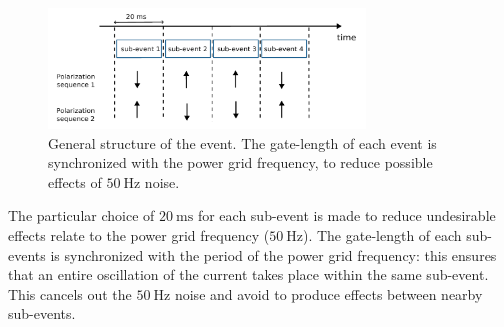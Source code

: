 \begin{figure}[hbtp] 
\centering
\includegraphics[width = 0.75\textwidth]{ExperimentalSetup/EventStructure.pdf}
\caption{General structure of the event. The gate-length of each event is synchronized with the power grid frequency, to reduce possible effects of $\SI{50}{\hertz}$ noise.}
\label{fig:EventStructure}
\end{figure}

The particular choice of $\SI{20}{\milli \second}$ for each sub-event is made to reduce undesirable effects relate to the power grid frequency ($\SI{50}{\hertz}$). The gate-length of each sub-events is synchronized with the period of the power grid frequency: this ensures that an entire oscillation of the current takes place within the same sub-event. This cancels out the $\SI{50}{\hertz}$ noise and avoid to produce effects between nearby sub-events.


